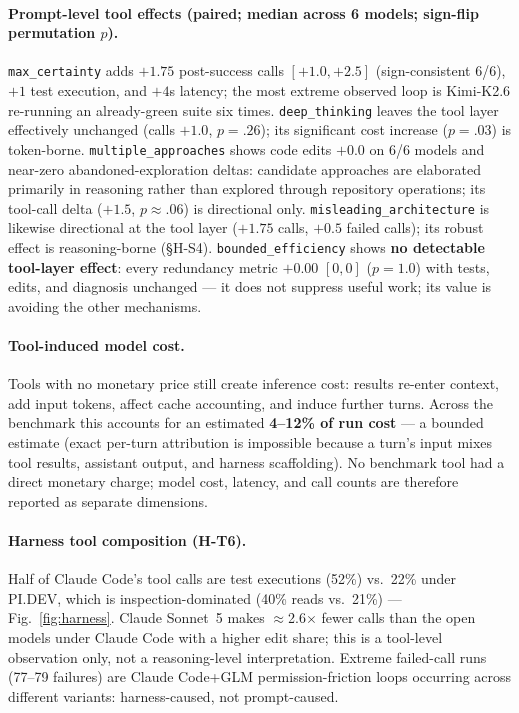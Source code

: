 \documentclass[11pt]{article}
\newcommand{\pidev}{PI.DEV}
\newcommand{\cc}{Claude Code}
\newcommand{\xd}{$\times$}
\begin{document}
\paragraph{Prompt-level tool effects (paired; median across 6 models;
sign-flip permutation $p$).} \texttt{max\_certainty} adds $+1.75$
post-success calls $[+1.0,+2.5]$ (sign-consistent 6/6), $+1$ test
execution, and $+4$s latency; the most extreme observed loop is Kimi-K2.6
re-running an already-green suite six times. \texttt{deep\_thinking}
leaves the tool layer effectively unchanged (calls $+1.0$, $p=.26$); its
significant cost increase ($p=.03$) is token-borne.
\texttt{multiple\_approaches} shows code edits $+0.0$ on 6/6 models and
near-zero abandoned-exploration deltas: candidate approaches are elaborated
primarily in reasoning rather than explored through repository operations;
its tool-call delta ($+1.5$, $p\approx.06$) is directional only. \texttt{misleading\_architecture}
is likewise directional at the tool layer ($+1.75$ calls, $+0.5$ failed
calls); its robust effect is reasoning-borne (\S H-S4).
\texttt{bounded\_efficiency} shows \textbf{no detectable tool-layer effect}:
every
redundancy metric $+0.00$ $[0,0]$ ($p=1.0$) with tests, edits, and
diagnosis unchanged --- it does not suppress useful work; its value is
avoiding the other mechanisms.

\paragraph{Tool-induced model cost.} Tools with no monetary price still
create inference cost: results re-enter context, add input tokens, affect
cache accounting, and induce further turns. Across the benchmark this
accounts for an estimated \textbf{4--12\% of run cost} --- a bounded
estimate (exact per-turn attribution is impossible because a turn's input
mixes tool results, assistant output, and harness scaffolding). No benchmark tool had a direct monetary charge; model cost, latency, and call
counts are therefore reported as separate dimensions.

\paragraph{Harness tool composition (H-T6).} Half of \cc{}'s tool calls
are test executions (52\%) vs.\ 22\% under \pidev{}, which is
inspection-dominated (40\% reads vs.\ 21\%) --- Fig.~\ref{fig:harness}.
Claude Sonnet~5 makes $\approx$2.6\xd{} fewer calls than the open models
under \cc{} with a higher edit share; this is a tool-level observation
only, not a reasoning-level interpretation. Extreme failed-call runs
(77--79 failures) are \cc{}+GLM permission-friction loops occurring across
different variants: harness-caused, not prompt-caused.
\end{document}
